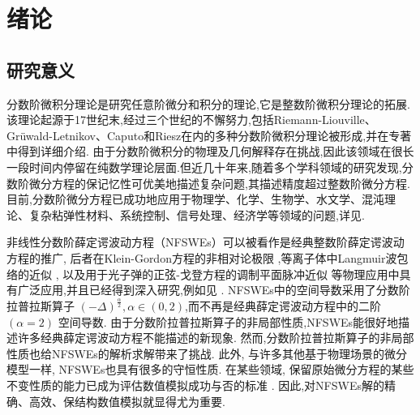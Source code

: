 \chapter[绪论]{绪论}

\section{研究意义}

分数阶微积分理论是研究任意阶微分和积分的理论,它是整数阶微积分理论的拓展.该理论起源于17世纪末,经过三个世纪的不懈努力,包括Riemann-Liouville、Grüwald-Letnikov、Caputo和Riesz在内的多种分数阶微积分理论被形成,并在专著\cite{samkoFractionalIntegralsDerivatives1993}中得到详细介绍.
由于分数阶微积分的物理及几何解释存在挑战,因此该领域在很长一段时间内停留在纯数学理论层面.但近几十年来,随着多个学科领域的研究发现,分数阶微分方程的保记忆性可优美地描述复杂问题,其描述精度超过整数阶微分方程.目前,分数阶微分方程已成功地应用于物理学、化学、生物学、水文学、混沌理论、复杂粘弹性材料、系统控制、信号处理、经济学等领域的问题,详见\cite{liIntroductionFractionalCalculus2015,HandbookDifferentialEquations2008,brychkovIndefiniteIntegrals2008,zhangMassBalanceBased2005,carrerasAnomalousDiffusionExit2001,hilferFRACTIONALCALCULUSREGULAR2000,liangRobustnessFractionalorderBoundary2007,maginSolvingFractionalOrder2009,zaslavskySelfsimilarTransportIncomplete1993,sunRandomorderFractionalDifferential2011}.

非线性分数阶薛定谔波动方程（NFSWEs）可以被看作是经典整数阶薛定谔波动方程的推广,
后者在Klein-Gordon方程的非相对论极限 \cite{tsutsumiNonrelativisticApproximationNonlinear1984,machiharaNonrelativisticLimitEnergy2002},等离子体中Langmuir波包络的近似 \cite{colinSemidiscretizationTimeNonlinear1998},
以及用于光子弹的正弦-戈登方程的调制平面脉冲近似 \cite{baoComparisonsSineGordonPerturbed2010,xinModelingLightBullets2000}等物理应用中具有广泛应用,并且已经得到深入研究,例如见 \cite{zhangConservativeNumericalScheme2003,baoUniformErrorEstimates2012,chengSeveralConservativeCompact2018,brugnanoClassEnergyconserving哈密顿ian2018}.
NFSWEs中的空间导数采用了分数阶拉普拉斯算子 $(-\Delta)^{\frac{\alpha}{2}}, \alpha \in(0,2)$,而不再是经典薛定谔波动方程中的二阶 $(\alpha=2)$ 空间导数.
由于分数阶拉普拉斯算子的非局部性质,NFSWEs能很好地描述许多经典薛定谔波动方程不能描述的新现象.
然而,分数阶拉普拉斯算子的非局部性质也给NFSWEs的解析求解带来了挑战.
此外, 与许多其他基于物理场景的微分模型一样, NFSWEs也具有很多的守恒性质. 
在某些领域, 保留原始微分方程的某些不变性质的能力已成为评估数值模拟成功与否的标准 \cite{liFiniteDifferenceCalculus1995}.
因此,对NFSWEs解的精确、高效、保结构数值模拟就显得尤为重要.
